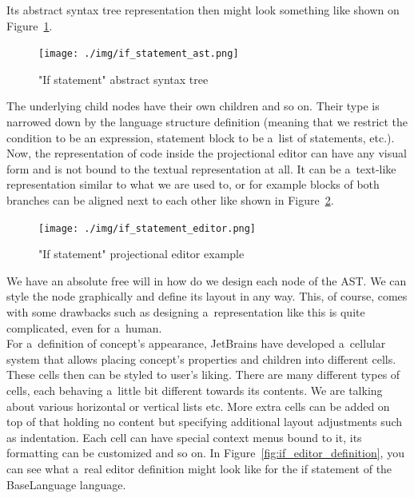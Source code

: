 \vspace{3mm}

Its abstract syntax tree representation then might look something like shown on Figure~\ref{fig:if_ast}.
\\

\begin{figure}[h]
	\centering
	\texttt{[image: ./img/if\_statement\_ast.png]}
	\caption{"If statement" abstract syntax tree}
	\label{fig:if_ast}
\end{figure}

The underlying child nodes have their own children and so on.
Their type is narrowed down by the language structure definition (meaning that we restrict the condition to be an expression, statement block to be a~list of statements, etc.).
\\

Now, the representation of code inside the projectional editor can have any visual form and is not bound to the textual representation at all.
It can be a~text-like representation similar to what we are used to, or for example blocks of both branches can be aligned next to each other like shown in Figure~\ref{fig:if_editor}.
\\

\begin{figure}[h]
	\centering
	\hspace{-4mm}
	\texttt{[image: ./img/if\_statement\_editor.png]}
	\caption{"If statement" projectional editor example}
	\label{fig:if_editor}
\end{figure}

We have an absolute free will in how do we design each node of the AST.
We can style the node graphically and define its layout in any way.
This, of course, comes with some drawbacks such as designing a~representation like this is quite complicated, even for a~human.
\\

For a~definition of concept's appearance, JetBrains have developed a~cellular system that allows placing concept's properties and children into different cells.
These cells then can be styled to user's liking.
There are many different types of cells, each behaving a~little bit different towards its contents.
We are talking about various horizontal or vertical lists etc.
More extra cells can be added on top of that holding no content but specifying additional layout adjustments such as indentation.
Each cell can have special context menus bound to it, its formatting can be customized and so on.
In Figure~\ref{fig:if_editor_definition}, you can see what a~real editor definition might look like for the if statement of the BaseLanguage language.

